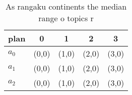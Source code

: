 \documentclass[a4paper]{article}
\begin{document}
\begin{table}
\begin{adjustbox}{width=0.6\columnwidth}
\begin{tabular}{|l|l|l|l|l|}
\hline
\textbf{plan} & \multicolumn{1}{c|}{\textbf{0}} & \multicolumn{1}{c|}{\textbf{1}} & \multicolumn{1}{c|}{\textbf{2}} & \multicolumn{1}{c|}{\textbf{3}} \\ \hline
\textbf{$a_0$}  & (0,0) & (1,0) & (2,0) & (3,0) \\ \hline
\textbf{$a_1$}  & (0,0) & (1,0) & (2,0) & (3,0) \\ \hline
\textbf{$a_2$}  & (0,0) & (1,0) & (2,0) & (3,0) \\ \hline
\end{tabular}
\end{adjustbox}
\caption{As rangaku continents the median range o topics r
}
\end{table}
\end{document}
